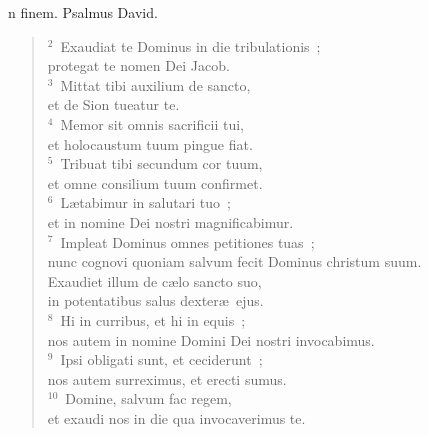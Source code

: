 \bchapter
{}n finem. Psalmus David.
\begin{flushleft}\begin{verse}\vspace{6pt}${}^{2}$~Exaudiat te Dominus in die tribulationis~;\\ protegat te nomen Dei Jacob.\\
${}^{3}$~Mittat tibi auxilium de sancto,\\ et de Sion tueatur te.\\
${}^{4}$~Memor sit omnis sacrificii tui,\\ et holocaustum tuum pingue fiat.\\
${}^{5}$~Tribuat tibi secundum cor tuum,\\ et omne consilium tuum confirmet.\\
${}^{6}$~L\ae tabimur in salutari tuo~;\\ et in nomine Dei nostri magnificabimur.\\
${}^{7}$~Impleat Dominus omnes petitiones tuas~;\\ nunc cognovi quoniam salvum fecit Dominus christum suum.\\ Exaudiet illum de c\ae lo sancto suo,\\ in potentatibus salus dexter\ae\ ejus.\\
${}^{8}$~Hi in curribus, et hi in equis~;\\ nos autem in nomine Domini Dei nostri invocabimus.\\
${}^{9}$~Ipsi obligati sunt, et ceciderunt~;\\ nos autem surreximus, et erecti sumus.\\
${}^{10}$~Domine, salvum fac regem,\\ et exaudi nos in die qua invocaverimus te.\end{verse}\end{flushleft}



